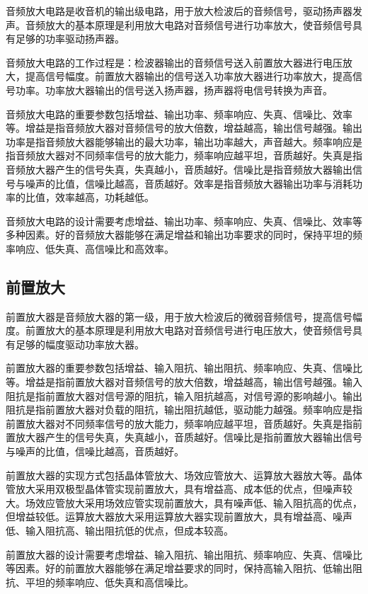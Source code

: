 \documentclass[12pt,UTF8]{ctexbook}
\begin{document}
音频放大电路是收音机的输出级电路，用于放大检波后的音频信号，驱动扬声器发声。音频放大的基本原理是利用放大电路对音频信号进行功率放大，使音频信号具有足够的功率驱动扬声器。

音频放大电路的工作过程是：检波器输出的音频信号送入前置放大器进行电压放大，提高信号幅度。前置放大器输出的信号送入功率放大器进行功率放大，提高信号功率。功率放大器输出的信号送入扬声器，扬声器将电信号转换为声音。

音频放大电路的重要参数包括增益、输出功率、频率响应、失真、信噪比、效率等。增益是指音频放大器对音频信号的放大倍数，增益越高，输出信号越强。输出功率是指音频放大器能够输出的最大功率，输出功率越大，声音越大。频率响应是指音频放大器对不同频率信号的放大能力，频率响应越平坦，音质越好。失真是指音频放大器产生的信号失真，失真越小，音质越好。信噪比是指音频放大器输出信号与噪声的比值，信噪比越高，音质越好。效率是指音频放大器输出功率与消耗功率的比值，效率越高，功耗越低。

音频放大电路的设计需要考虑增益、输出功率、频率响应、失真、信噪比、效率等多种因素。好的音频放大器能够在满足增益和输出功率要求的同时，保持平坦的频率响应、低失真、高信噪比和高效率。

\subsection{前置放大}

前置放大器是音频放大器的第一级，用于放大检波后的微弱音频信号，提高信号幅度。前置放大的基本原理是利用放大电路对音频信号进行电压放大，使音频信号具有足够的幅度驱动功率放大器。

前置放大器的重要参数包括增益、输入阻抗、输出阻抗、频率响应、失真、信噪比等。增益是指前置放大器对音频信号的放大倍数，增益越高，输出信号越强。输入阻抗是指前置放大器对信号源的阻抗，输入阻抗越高，对信号源的影响越小。输出阻抗是指前置放大器对负载的阻抗，输出阻抗越低，驱动能力越强。频率响应是指前置放大器对不同频率信号的放大能力，频率响应越平坦，音质越好。失真是指前置放大器产生的信号失真，失真越小，音质越好。信噪比是指前置放大器输出信号与噪声的比值，信噪比越高，音质越好。

前置放大器的实现方式包括晶体管放大、场效应管放大、运算放大器放大等。晶体管放大采用双极型晶体管实现前置放大，具有增益高、成本低的优点，但噪声较大。场效应管放大采用场效应管实现前置放大，具有噪声低、输入阻抗高的优点，但增益较低。运算放大器放大采用运算放大器实现前置放大，具有增益高、噪声低、输入阻抗高、输出阻抗低的优点，但成本较高。

前置放大器的设计需要考虑增益、输入阻抗、输出阻抗、频率响应、失真、信噪比等因素。好的前置放大器能够在满足增益要求的同时，保持高输入阻抗、低输出阻抗、平坦的频率响应、低失真和高信噪比。
\end{document}
